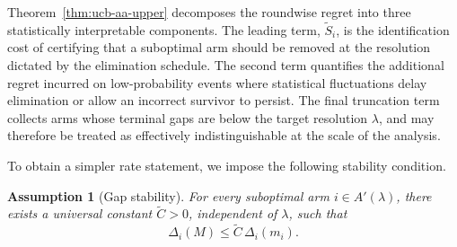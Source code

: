 \documentclass[
  12pt]{article}
\newtheorem{assumption}{Assumption}
\begin{document}
Theorem~\ref{thm:ucb-aa-upper} decomposes the roundwise regret into three statistically interpretable components. The leading term, \(\tilde S_i\), is the identification cost of certifying that a suboptimal arm should be removed at the resolution dictated by the elimination schedule. The second term quantifies the additional regret incurred on low-probability events where statistical fluctuations delay elimination or allow an incorrect survivor to persist. The final truncation term collects arms whose terminal gaps are below the target resolution \(\lambda\), and may therefore be treated as effectively indistinguishable at the scale of the analysis.

To obtain a simpler rate statement, we impose the following stability condition.

\begin{assumption}[Gap stability]
\label{ass:gap_stability}
For every suboptimal arm \(i \in A'(\lambda)\), there exists a universal constant \(\tilde{C}>0\), independent of \(\lambda\), such that
\[
\Delta_i(M) \leq \tilde{C}\,\Delta_i(m_i).
\]
\end{assumption}

\end{document}
